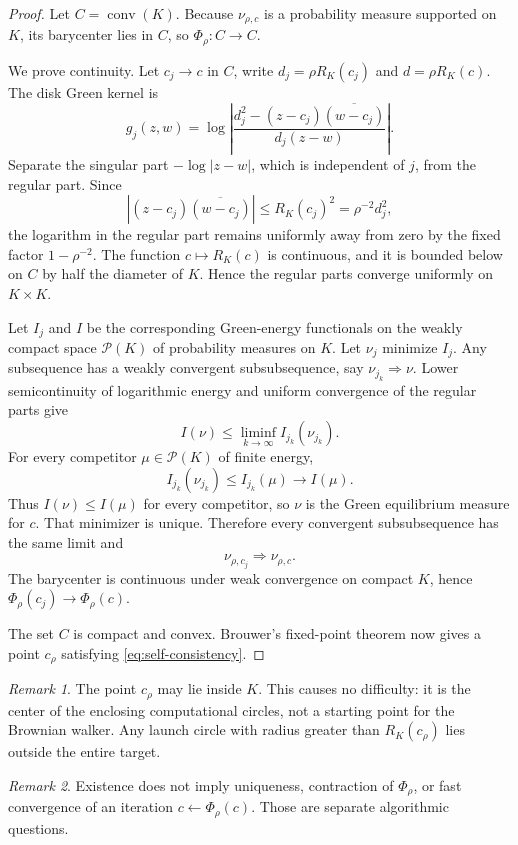 \documentclass[11pt]{article}
\theoremstyle{mainthm}
\theoremstyle{definition}
\theoremstyle{remark}
\newtheorem{remark}[remark]{Remark}
\newcommand{\conv}{\operatorname{conv}}
\begin{document}
\begin{proof}
Let $C=\conv(K)$. Because $\nu_{\rho,c}$ is a probability measure supported on $K$, its barycenter lies in $C$, so $\Phi_\rho:C\to C$.

We prove continuity. Let $c_j\to c$ in $C$, write $d_j=\rho R_K(c_j)$ and $d=\rho R_K(c)$. The disk Green kernel is
\[
  g_j(z,w)=
  \log\left|
  \frac{d_j^2-(z-c_j)\overline{(w-c_j)}}
       {d_j(z-w)}
  \right|.
\]
Separate the singular part $-\log|z-w|$, which is independent of $j$, from the regular part. Since
\[
  |(z-c_j)\overline{(w-c_j)}|
  \le R_K(c_j)^2=\rho^{-2}d_j^2,
\]
the logarithm in the regular part remains uniformly away from zero by the fixed factor $1-\rho^{-2}$. The function $c\mapsto R_K(c)$ is continuous, and it is bounded below on $C$ by half the diameter of $K$. Hence the regular parts converge uniformly on $K\times K$.

Let $I_j$ and $I$ be the corresponding Green-energy functionals on the weakly compact space $\mathcal P(K)$ of probability measures on $K$. Let $\nu_j$ minimize $I_j$. Any subsequence has a weakly convergent subsubsequence, say $\nu_{j_k}\Rightarrow\nu$. Lower semicontinuity of logarithmic energy and uniform convergence of the regular parts give
\[
  I(\nu)\le\liminf_{k\to\infty}I_{j_k}(\nu_{j_k}).
\]
For every competitor $\mu\in\mathcal P(K)$ of finite energy,
\[
  I_{j_k}(\nu_{j_k})\le I_{j_k}(\mu)\longrightarrow I(\mu).
\]
Thus $I(\nu)\le I(\mu)$ for every competitor, so $\nu$ is the Green equilibrium measure for $c$. That minimizer is unique. Therefore every convergent subsubsequence has the same limit and
\[
  \nu_{\rho,c_j}\Rightarrow\nu_{\rho,c}.
\]
The barycenter is continuous under weak convergence on compact $K$, hence $\Phi_\rho(c_j)\to\Phi_\rho(c)$.

The set $C$ is compact and convex. Brouwer's fixed-point theorem now gives a point $c_\rho$ satisfying \eqref{eq:self-consistency}.
\end{proof}

\begin{remark}
The point $c_\rho$ may lie inside $K$. This causes no difficulty: it is the center of the enclosing computational circles, not a starting point for the Brownian walker. Any launch circle with radius greater than $R_K(c_\rho)$ lies outside the entire target.
\end{remark}

\begin{remark}
Existence does not imply uniqueness, contraction of $\Phi_\rho$, or fast convergence of an iteration $c\leftarrow\Phi_\rho(c)$. Those are separate algorithmic questions.
\end{remark}
\end{document}
